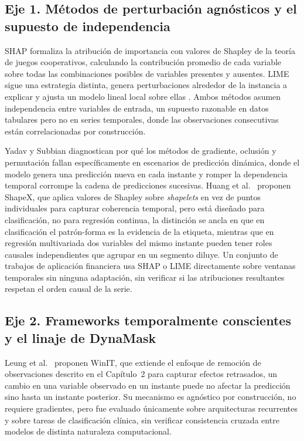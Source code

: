 \subsection{Eje 1. Métodos de perturbación agnósticos y el supuesto de independencia}

SHAP formaliza la atribución de importancia con valores de Shapley de la teoría de juegos cooperativos, calculando la contribución promedio de cada variable sobre todas las combinaciones posibles de variables presentes y ausentes. LIME sigue una estrategia distinta, genera perturbaciones alrededor de la instancia a explicar y ajusta un modelo lineal local sobre ellas \cite{arsenault2025}. Ambos métodos asumen independencia entre variables de entrada, un supuesto razonable en datos tabulares pero no en series temporales, donde las observaciones consecutivas están correlacionadas por construcción.

Yadav y Subbian \cite{yadav2025} diagnostican por qué los métodos de gradiente, oclusión y permutación fallan específicamente en escenarios de predicción dinámica, donde el modelo genera una predicción nueva en cada instante y romper la dependencia temporal corrompe la cadena de predicciones sucesivas. Huang et al.\ \cite{huang2025} proponen ShapeX, que aplica valores de Shapley sobre \emph{shapelets} en vez de puntos individuales para capturar coherencia temporal, pero está diseñado para clasificación, no para regresión continua, la distinción se ancla en que en clasificación el patrón-forma es la evidencia de la etiqueta, mientras que en regresión multivariada dos variables del mismo instante pueden tener roles causales independientes que agrupar en un segmento diluye. Un conjunto de trabajos de aplicación financiera \cite{gupta2025, sathyampeth2025, manikrao2026, jagannathan2025, kumar2024, singh2025, muhammad2024} usa SHAP o LIME directamente sobre ventanas temporales sin ninguna adaptación, sin verificar si las atribuciones resultantes respetan el orden causal de la serie.

\subsection{Eje 2. Frameworks temporalmente conscientes y el linaje de DynaMask}

Leung et al.\ \cite{leung2023winit} proponen WinIT, que extiende el enfoque de remoción de observaciones descrito en el Capítulo~2 para capturar efectos retrasados, un cambio en una variable observado en un instante puede no afectar la predicción sino hasta un instante posterior. Su mecanismo es agnóstico por construcción, no requiere gradientes, pero fue evaluado únicamente sobre arquitecturas recurrentes y sobre tareas de clasificación clínica, sin verificar consistencia cruzada entre modelos de distinta naturaleza computacional.

